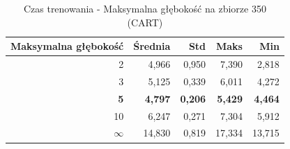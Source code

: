 \begin{table}[htbp]
\centering
\small
\setlength{\tabcolsep}{6pt}
\renewcommand{\arraystretch}{1.2}
\caption{Czas trenowania - Maksymalna głębokość na zbiorze 350 (CART)}
\label{tab:CART_max_depth_350_time}
\begin{tabular}{r|r|r|r|r}
\toprule
Maksymalna głębokość & Średnia & Std & Maks & Min \\
\hline
2 & 4,966 & 0,950 & 7,390 & 2,818 \\
3 & 5,125 & 0,339 & 6,011 & 4,272 \\
\textbf{5} & \textbf{4,797} & \textbf{0,206} & \textbf{5,429} & \textbf{4,464} \\
10 & 6,247 & 0,271 & 7,304 & 5,912 \\
$\infty$ & 14,830 & 0,819 & 17,334 & 13,715 \\
\bottomrule
\end{tabular}
\end{table}